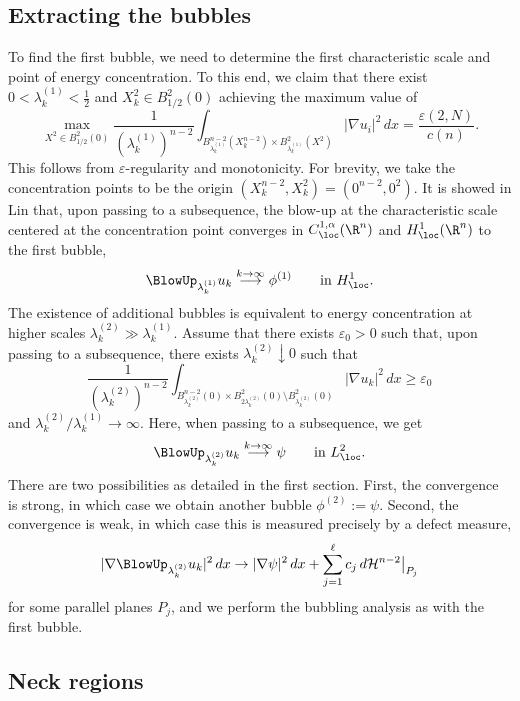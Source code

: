 \documentclass[reqno]{amsart}
\theoremstyle{definition}
\theoremstyle{remark}
\renewcommand{\epsilon}{\varepsilon}
\begin{document}
\subsection{Extracting the bubbles}

To find the first bubble, we need to determine the first characteristic scale and point of energy concentration. To this end, we claim that there exist $0 < \lambda_k^{(1)} < \tfrac12$ and $X^2_k \in B^2_{1/2} (0)$ achieving the maximum value of 
	\[ \max_{X^2 \in B^2_{1/2} (0)} \frac{1}{\left(\lambda_k^{(1)}\right)^{n - 2}} \int_{B^{n - 2}_{\lambda_k^{(1)}} (X^{n - 2}_k) \times B_{\lambda_k^{(1)}}^2 (X^2)} |\nabla u_i|^2 \, dx= \frac{\epsilon(2, N)}{c(n)}.\]
This follows from $\epsilon$-regularity and monotonicity. For brevity, we take the concentration points to be the origin $(X^{n - 2}_k, X^2_k) = (0^{n - 2}, 0^2)$. It is showed in Lin that, upon passing to a subsequence, the blow-up at the characteristic scale centered at the concentration point converges in $C^{1,\alpha}_\loc (\R^n)$ and $H^1_\loc (\R^n)$ to the first bubble, 
	\[ \BlowUp_{\lambda_k^{(1)}} u_k \overset{k \to \infty}{\longrightarrow} \phi^{(1)} \qquad \text{in $H^1_\loc$}. \]	
The existence of additional bubbles is equivalent to energy concentration at higher scales $\lambda_k^{(2)} \gg \lambda_k^{(1)}$. Assume that there exists $\epsilon_0 > 0$ such that, upon passing to a subsequence, there exists $\lambda_k^{(2)} \downarrow 0$ such that	
	\begin{equation}
		 \frac{1}{\left( \lambda_k^{(2)} \right)^{n - 2}} \int_{B^{n - 2}_{\lambda_k^{(2)}} (0) \times B^{2}_{2\lambda_k^{(2)}} (0) \setminus B^2_{\lambda_k^{(2)}} (0)} |\nabla u_k|^2 \, dx \geq \epsilon_0 
	\end{equation}	 
and $	\lambda_k^{(2)}/\lambda_k^{(1)} \to \infty$. Here, when passing to a subsequence, we get 
	\[ \BlowUp_{\lambda_k^{(2)}} u_k \overset{k \to \infty}{\longrightarrow} \psi \qquad \text{in $L^2_\loc$}.\]
There are two possibilities as detailed in the first section. First, the convergence is strong, in which case we obtain another bubble $\phi^{(2)} := \psi$. Second, the convergence is weak, in which case this is measured precisely by a defect measure,
	\[ |\nabla \BlowUp_{\lambda_k^{(2)}} u_k|^2 \, dx \to |\nabla \psi|^2 \, dx + \sum_{j = 1}^\ell c_j \, d \mathcal H^{n - 2} \big|_{P_j} \]
for some parallel planes $P_j$, and we perform the bubbling analysis as with the first bubble. 
	
\subsection{Neck regions}
\end{document}
